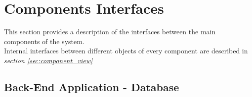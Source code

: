 \section{Components Interfaces} %
\label{sec:components_interfaces}
This section provides a description of the interfaces between the main components of the system.\\
Internal interfaces between different objects of every component are described in \emph{section \ref{sec:component_view}}
\subsection{Back-End Application - Database} %
\label{sub:back_end_application_database}

